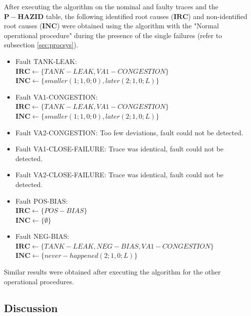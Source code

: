 \documentclass[conference]{IEEEtran}
\begin{document}
After executing the algorithm on the nominal and faulty traces and the $\mathbf{P-HAZID}$ table, the following identified root causes ($\mathbf{IRC}$) and non-identified root causes ($\mathbf{INC}$) were obtained using the algorithm with the "Normal operational procedure" during the presence of the single failures (refer to subsection \ref{sec:procsys}).

\begin{itemize}

\item Fault TANK-LEAK: \\ $\mathbf{IRC} \leftarrow \{ TANK-LEAK,VA1-CONGESTION \} $\\ $\mathbf{INC} \leftarrow \{ smaller(1;1,0;0), later(2;1,0;L) \}$

\item Fault VA1-CONGESTION: \\ $\mathbf{IRC} \leftarrow \{ TANK-LEAK,VA1-CONGESTION \}$\\ $\mathbf{INC} \leftarrow \{ smaller(1;1,0;0), later(2;1,0;L) \}$

\item Fault VA2-CONGESTION: Too few deviations, fault could not be detected.

\item Fault VA1-CLOSE-FAILURE: Trace was identical, fault could not be detected.

\item Fault VA2-CLOSE-FAILURE: Trace was identical, fault could not be detected.

\item Fault POS-BIAS: \\ $\mathbf{IRC} \leftarrow \{ POS-BIAS \}$ \\ $\mathbf{INC} \leftarrow \{ \emptyset \} $

\item Fault NEG-BIAS: \\ $\mathbf{IRC} \leftarrow \{ TANK-LEAK, NEG-BIAS, VA1-CONGESTION \}$ \\ $\mathbf{INC} \leftarrow \{ never-happened(2;1,0;L) \}$

\end{itemize}

Similar results were obtained after executing the algorithm for the other operational procedures.

\subsection{Discussion}
\label{sec:discussion}
\end{document}
